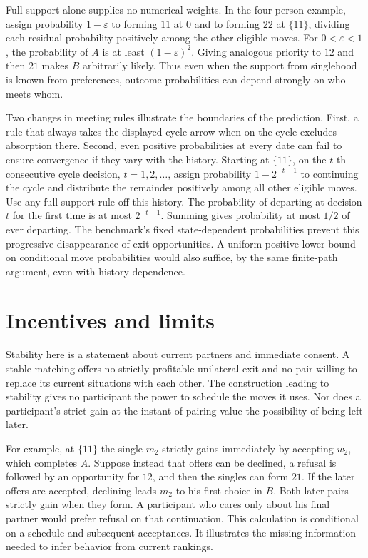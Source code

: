 \documentclass[11pt]{article}
\begin{document}
Full support alone supplies no numerical weights. In the four-person example, assign probability \(1-\varepsilon\) to forming \(11\) at \(0\) and to forming \(22\) at \(\{11\}\), dividing each residual probability positively among the other eligible moves. For \(0<\varepsilon<1\), the probability of \(A\) is at least \((1-\varepsilon)^2\). Giving analogous priority to \(12\) and then \(21\) makes \(B\) arbitrarily likely. Thus even when the support from singlehood is known from preferences, outcome probabilities can depend strongly on who meets whom.

Two changes in meeting rules illustrate the boundaries of the prediction. First, a rule that always takes the displayed cycle arrow when on the cycle excludes absorption there. Second, even positive probabilities at every date can fail to ensure convergence if they vary with the history. Starting at \(\{11\}\), on the \(t\)-th consecutive cycle decision, \(t=1,2,\ldots\), assign probability \(1-2^{-t-1}\) to continuing the cycle and distribute the remainder positively among all other eligible moves. Use any full-support rule off this history. The probability of departing at decision \(t\) for the first time is at most \(2^{-t-1}\). Summing gives probability at most \(1/2\) of ever departing. The benchmark's fixed state-dependent probabilities prevent this progressive disappearance of exit opportunities. A uniform positive lower bound on conditional move probabilities would also suffice, by the same finite-path argument, even with history dependence.

\section{Incentives and limits}

Stability here is a statement about current partners and immediate consent. A stable matching offers no strictly profitable unilateral exit and no pair willing to replace its current situations with each other. The construction leading to stability gives no participant the power to schedule the moves it uses. Nor does a participant's strict gain at the instant of pairing value the possibility of being left later.

For example, at \(\{11\}\) the single \(m_2\) strictly gains immediately by accepting \(w_2\), which completes \(A\). Suppose instead that offers can be declined, a refusal is followed by an opportunity for \(12\), and then the singles can form \(21\). If the later offers are accepted, declining leads \(m_2\) to his first choice in \(B\). Both later pairs strictly gain when they form. A participant who cares only about his final partner would prefer refusal on that continuation. This calculation is conditional on a schedule and subsequent acceptances. It illustrates the missing information needed to infer behavior from current rankings.
\end{document}

